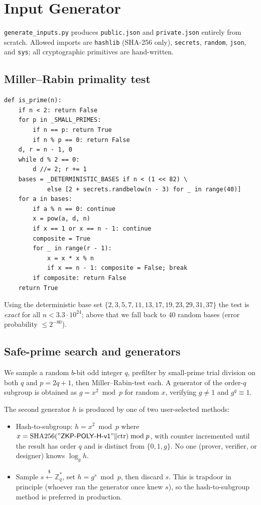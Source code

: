 \documentclass[11pt,a4paper]{article}
\begin{document}
\section{Input Generator}

\texttt{generate\_inputs.py} produces \texttt{public.json} and
\texttt{private.json} entirely from scratch. Allowed imports are
\texttt{hashlib} (SHA-256 only), \texttt{secrets}, \texttt{random},
\texttt{json}, and \texttt{sys}; all cryptographic primitives are
hand-written.

\subsection{Miller--Rabin primality test}

\begin{lstlisting}[style=pythonstyle]
def is_prime(n):
    if n < 2: return False
    for p in _SMALL_PRIMES:
        if n == p: return True
        if n % p == 0: return False
    d, r = n - 1, 0
    while d % 2 == 0:
        d //= 2; r += 1
    bases = _DETERMINISTIC_BASES if n < (1 << 82) \
            else [2 + secrets.randbelow(n - 3) for _ in range(40)]
    for a in bases:
        if a % n == 0: continue
        x = pow(a, d, n)
        if x == 1 or x == n - 1: continue
        composite = True
        for _ in range(r - 1):
            x = x * x % n
            if x == n - 1: composite = False; break
        if composite: return False
    return True
\end{lstlisting}

Using the deterministic base set $\{2,3,5,7,11,13,17,19,23,29,31,37\}$
the test is \emph{exact} for all $n < 3.3\cdot10^{24}$; above that we
fall back to $40$ random bases (error probability $\le 2^{-80}$).

\subsection{Safe-prime search and generators}

We sample a random $b$-bit odd integer $q$, prefilter by small-prime
trial division on both $q$ and $p = 2q+1$, then Miller--Rabin-test each.
A generator of the order-$q$ subgroup is obtained as $g = x^{2} \bmod p$
for random $x$, verifying $g \ne 1$ and $g^{q} \equiv 1$.

The second generator $h$ is produced by one of two user-selected methods:

\begin{itemize}
  \item[\texttt{--h-mode hash}]
    Hash-to-subgroup: $h = x^{2} \bmod p$ where
    $x = \mathrm{SHA256}(\mathsf{"ZKP\text{-}POLY\text{-}H\text{-}v1"} \| \text{ctr})
    \bmod p$, with counter incremented until the result has order $q$
    and is distinct from $\{0,1,g\}$. No one (prover, verifier, or
    designer) knows $\log_g h$.
  \item[\texttt{--h-mode discard}]
    Sample $s \xleftarrow{\$} \mathbb{Z}_q^{*}$, set $h = g^{s} \bmod p$,
    then discard $s$. This is trapdoor in principle (whoever ran the
    generator once knew $s$), so the hash-to-subgroup method is
    preferred in production.
\end{itemize}
\end{document}
